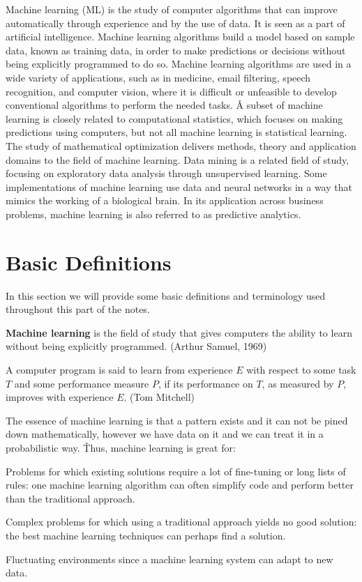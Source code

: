Machine learning (ML) is the study of computer algorithms that can improve automatically through experience and by
the use of data. It is seen as a part of artificial intelligence. Machine learning algorithms build a model based on
sample data, known as training data, in order to make predictions or decisions without being explicitly programmed to
do so. Machine learning algorithms are used in a wide variety of applications, such as in medicine, email filtering,
speech recognition, and computer vision, where it is difficult or unfeasible to develop conventional algorithms to
perform the needed tasks. \v

A subset of machine learning is closely related to computational statistics, which focuses on making predictions
using computers, but not all machine learning is statistical learning. The study of mathematical optimization
delivers methods, theory and application domains to the field of machine learning. Data mining is a related field of
study, focusing on exploratory data analysis through unsupervised learning. Some implementations of machine learning
use data and neural networks in a way that mimics the working of a biological brain. In its application across
business problems, machine learning is also referred to as predictive analytics.

\section{Basic Definitions}

In this section we will provide some basic definitions and terminology used throughout this part of the notes.

\textbf{Machine learning} is the field of study that gives computers the ability to learn without being explicitly
programmed. (Arthur Samuel, 1969)
\ed

A computer program is said to learn from experience $E$ with respect to some task $T$ and some performance measure
$P$, if its performance on $T$, as measured by $P$, improves with experience $E$. (Tom Mitchell)
\ed

The essence of machine learning is that a pattern exists and it can not be pined down mathematically, however we have
data on it and we can treat it in a probabilistic way. \v

Thus, machine learning is great for:
\bit
\item Problems for which existing solutions require a lot of fine-tuning or long lists of rules: one machine learning
algorithm can often simplify code and perform better than the traditional approach.
\item Complex problems for which using a traditional approach yields no good solution: the best machine learning
techniques can perhaps find a solution.
\item Fluctuating environments since a machine learning system can adapt to new data.
\eit

